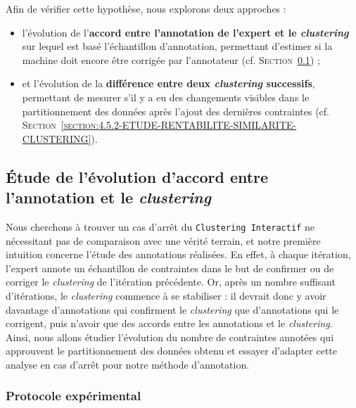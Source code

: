 	Afin de vérifier cette hypothèse, nous explorons deux approches :
	\begin{itemize}
		\item l'évolution de l'\textbf{accord entre l'annotation de l'expert et le \textit{clustering}} sur lequel est basé l'échantillon d'annotation, permettant d'estimer si la machine doit encore être corrigée par l'annotateur  (cf. \textsc{Section~\ref{section:4.5.1-ETUDE-RENTABILITE-ACCORD-ANNOTATION-CLUSTERING}}) ;
		\item et l'évolution de la \textbf{différence entre deux \textit{clustering} successifs}, permettant de mesurer s'il y a eu des changements visibles dans le partitionnement des données après l'ajout des dernières contraintes (cf. \textsc{Section~\ref{section:4.5.2-ETUDE-RENTABILITE-SIMILARITE-CLUSTERING}}).
	\end{itemize}
	
	
	\subsection{Étude de l'évolution d'accord entre l'annotation et le \textit{clustering}}
	\label{section:4.5.1-ETUDE-RENTABILITE-ACCORD-ANNOTATION-CLUSTERING}
		
		Nous cherchons à trouver un cas d'arrêt du \texttt{Clustering Interactif} ne nécessitant pas de comparaison avec une vérité terrain, et notre première intuition concerne l'étude des annotations réalisées.
		En effet, à chaque itération, l'expert annote un échantillon de contraintes dans le but de confirmer ou de corriger le \textit{clustering} de l'itération précédente.
		Or, après un nombre suffisant d'itérations, le \textit{clustering} commence à se stabiliser : il devrait donc y avoir davantage d'annotations qui confirment le \textit{clustering} que d'annotations qui le corrigent, puis n'avoir que des accords entre les annotations et le \textit{clustering}.
		Ainsi, nous allons étudier l'évolution du nombre de contraintes annotées qui approuvent le partitionnement des données obtenu et essayer d'adapter cette analyse en cas d'arrêt pour notre méthode d'annotation.
	
		\subsubsection{Protocole expérimental}
			
